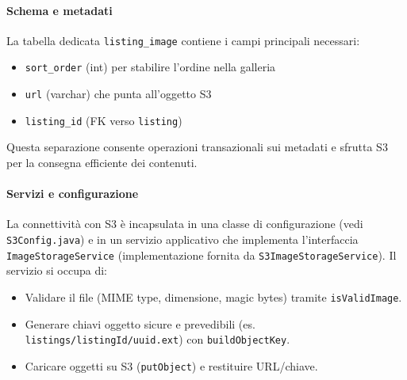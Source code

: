 \paragraph{Schema e metadati}
La tabella dedicata \texttt{listing\_image} contiene i campi principali necessari:
\begin{itemize}
    \item \texttt{sort\_order} (int) per stabilire l'ordine nella galleria
    \item \texttt{url} (varchar) che punta all'oggetto S3
    \item \texttt{listing\_id} (FK verso \texttt{listing})
\end{itemize}
Questa separazione consente operazioni transazionali sui metadati e sfrutta S3 per la consegna efficiente dei contenuti.

\paragraph{Servizi e configurazione}
La connettività con S3 è incapsulata in una classe di configurazione (vedi \texttt{S3Config.java}) e in un servizio applicativo che implementa l'interfaccia \texttt{ImageStorageService} (implementazione fornita da \texttt{S3ImageStorageService}). Il servizio si occupa di:

\begin{itemize}
    \item Validare il file (MIME type, dimensione, magic bytes) tramite \texttt{isValidImage}.
    \item Generare chiavi oggetto sicure e prevedibili (es. \texttt{listings/{listingId}/{uuid}.{ext}}) con \texttt{buildObjectKey}.
    \item Caricare oggetti su S3 (\texttt{putObject}) e restituire URL/chiave.
\end{itemize}

